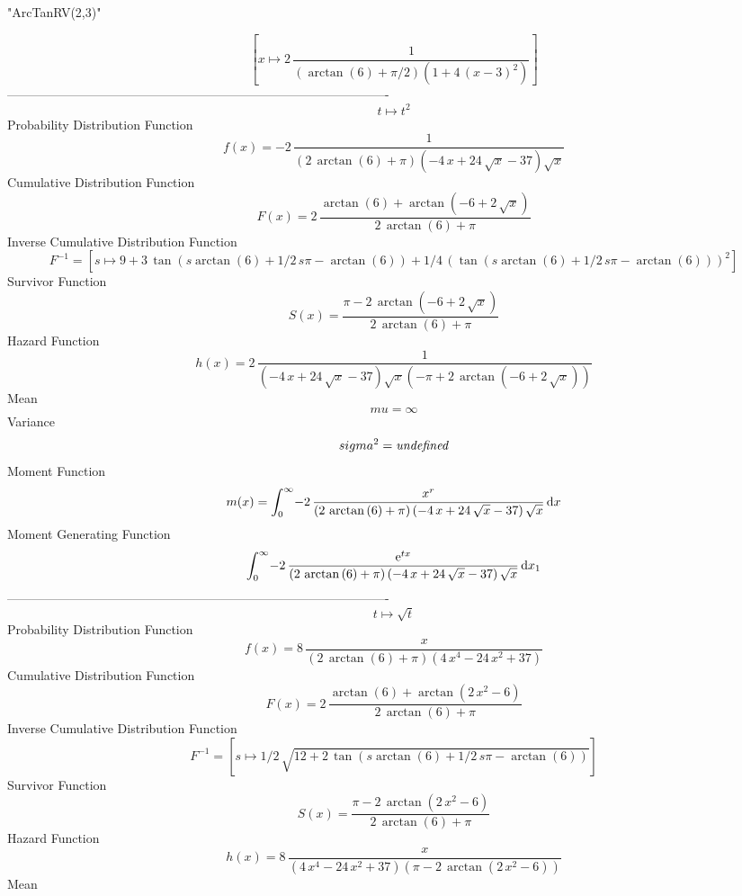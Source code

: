 \documentclass[12pt]{article}
\begin{document}
 
                               "ArcTanRV(2,3)"

$$[x\mapsto 2\,{\frac {1}{ \left( \arctan \left( 6 \right) +\pi/2
 \right)  \left( 1+4\, \left( x-3 \right) ^{2} \right) }}]
$$-------------------------------------------------------------------------------------------  \\$$t\mapsto {t}^{2}
$$Probability Distribution Function 
$$  f(x)=-2\,{\frac {1}{ \left( 2\,\arctan \left( 6 \right) +\pi \right) 
 \left( -4\,x+24\,\sqrt {x}-37 \right) \sqrt {x}}}
$$Cumulative Distribution Function  
 $$F(x)=2\,{\frac {\arctan \left( 6 \right) +\arctan \left( -6+2\,\sqrt {x}
 \right) }{2\,\arctan \left( 6 \right) +\pi}}
$$ Inverse Cumulative Distribution Function 
  $$F^{-1} = [s\mapsto 9+3\,\tan \left( s\arctan \left( 6 \right) +1/2\,s\pi-
\arctan \left( 6 \right)  \right) +1/4\, \left( \tan \left( s\arctan
 \left( 6 \right) +1/2\,s\pi-\arctan \left( 6 \right)  \right) 
 \right) ^{2}]
$$Survivor Function 
 $$ S(x)={\frac {\pi-2\,\arctan \left( -6+2\,\sqrt {x} \right) }{2\,\arctan
 \left( 6 \right) +\pi}}
$$ Hazard Function 
 $$ h(x)=2\,{\frac {1}{ \left( -4\,x+24\,\sqrt {x}-37 \right) \sqrt {x} \left( 
-\pi+2\,\arctan \left( -6+2\,\sqrt {x} \right)  \right) }}
$$Mean 
 $$ mu=\infty 
$$ Variance 
 $$ sigma^2 = {\it undefined}
$$Moment Function 
 $$ m(x) = \int_{0}^{\infty }\!-2\,{\frac {{x}^{r}}{ \left( 2\,\arctan \left( 6
 \right) +\pi \right)  \left( -4\,x+24\,\sqrt {x}-37 \right) \sqrt {x}
}}\,{\rm d}x
$$ Moment Generating Function 
 $$\int_{0}^{\infty }\!-2\,{\frac {{{\rm e}^{tx}}}{ \left( 2\,\arctan
 \left( 6 \right) +\pi \right)  \left( -4\,x+24\,\sqrt {x}-37 \right) 
\sqrt {x}}}\,{\rm d}x_{{1}}
$$-------------------------------------------------------------------------------------------  \\$$t\mapsto \sqrt {t}
$$Probability Distribution Function 
$$  f(x)=8\,{\frac {x}{ \left( 2\,\arctan \left( 6 \right) +\pi \right) 
 \left( 4\,{x}^{4}-24\,{x}^{2}+37 \right) }}
$$Cumulative Distribution Function  
 $$F(x)=2\,{\frac {\arctan \left( 6 \right) +\arctan \left( 2\,{x}^{2}-6
 \right) }{2\,\arctan \left( 6 \right) +\pi}}
$$ Inverse Cumulative Distribution Function 
  $$F^{-1} = [s\mapsto 1/2\,\sqrt {12+2\,\tan \left( s\arctan \left( 6 \right) +1/2
\,s\pi-\arctan \left( 6 \right)  \right) }]
$$Survivor Function 
 $$ S(x)={\frac {\pi-2\,\arctan \left( 2\,{x}^{2}-6 \right) }{2\,\arctan
 \left( 6 \right) +\pi}}
$$ Hazard Function 
 $$ h(x)=8\,{\frac {x}{ \left( 4\,{x}^{4}-24\,{x}^{2}+37 \right)  \left( \pi-2
\,\arctan \left( 2\,{x}^{2}-6 \right)  \right) }}
$$Mean 
\end{document}
